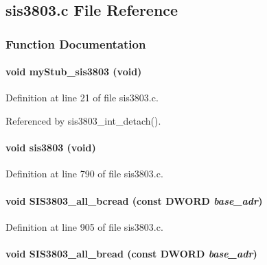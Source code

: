 \subsection{sis3803.c File Reference}
\label{sis3803_8c}


\subsubsection{Function Documentation}
\paragraph[{myStub\_\-sis3803}]{\setlength{\rightskip}{0pt plus 5cm}void myStub\_\-sis3803 (void)}\hfill\label{sis3803_8c_aa442b3e522be9529eb727abb02c3ced4}


Definition at line 21 of file sis3803.c.

Referenced by sis3803\_\-int\_\-detach().
\paragraph[{sis3803}]{\setlength{\rightskip}{0pt plus 5cm}void sis3803 (void)}\hfill\label{sis3803_8c_a88a8a23b3616e8dace889eaeb91fb72f}


Definition at line 790 of file sis3803.c.
\paragraph[{SIS3803\_\-all\_\-bcread}]{\setlength{\rightskip}{0pt plus 5cm}void SIS3803\_\-all\_\-bcread (const {\bf DWORD} {\em base\_\-adr})}\hfill\label{sis3803_8c_aadd748a628ec68378c66a2d3beb7a825}


Definition at line 905 of file sis3803.c.
\paragraph[{SIS3803\_\-all\_\-bread}]{\setlength{\rightskip}{0pt plus 5cm}void SIS3803\_\-all\_\-bread (const {\bf DWORD} {\em base\_\-adr})}\hfill\label{sis3803_8c_aa17ad0067e232d32d64c2a194595d177}


